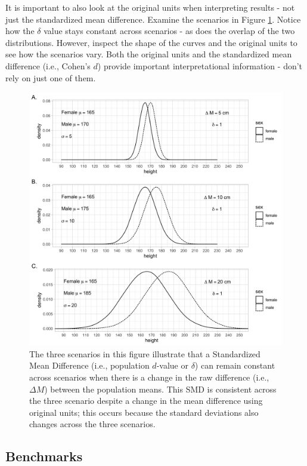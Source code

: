 \documentclass[
]{krantz}
\begin{document}
It is important to also look at the original units when interpreting results - not just the standardized mean difference. Examine the scenarios in Figure \ref{fig:dex3}. Notice how the \(\delta\) value stays constant across scenarios - as does the overlap of the two distributions. However, inspect the shape of the curves and the original units to see how the scenarios vary. Both the original units and the standardized mean difference (i.e., Cohen's \(d\)) provide important interpretational information - don't rely on just one of them.

\begin{figure}
\includegraphics[width=1\linewidth]{ch_populations/images/dvalue_ex3} \caption[Caveats for standardized mean difference]{The three scenarios in this figure illustrate that a Standardized Mean Difference (i.e., population $d$-value or $\delta$) can remain constant across scenarios when there is a change in the raw difference (i.e., $\Delta M$) between the population means. This SMD is consistent across the three scenario despite a change in the mean difference using original units; this occurs because the standard deviations also changes across the three scenarios.}\label{fig:dex3}
\end{figure}

\hypertarget{benchmarks}{%
\subsection{Benchmarks}\label{benchmarks}}
\end{document}
